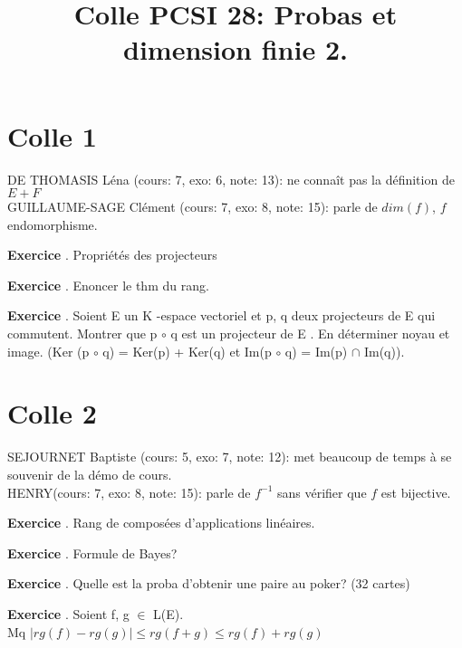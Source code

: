 \documentclass[10pt,a4paper]{article}
\title{Colle PCSI 28: Probas et dimension finie 2.}
\newcounter{question}
\newcounter{exo}
\newenvironment{exo}{\vspace{0.5cm}\setcounter{question}{0}\addtocounter{exo}{1} \noindent \textbf{Exercice \theexo}. \normalsize }{\par}
\begin{document}
	\maketitle
	
	\section*{Colle 1}
	\setcounter{exo}{0}
	DE THOMASIS Léna (cours: 7, exo: 6, note: 13): ne connaît pas la définition de $E + F$\\
	GUILLAUME-SAGE Clément (cours: 7, exo: 8, note: 15): parle de $dim(f)$, $f$ endomorphisme.\\
	
	\begin{exo}
		  Propriétés des projecteurs
	\end{exo}

	\begin{exo}
		Enoncer le thm du rang.
	\end{exo}

	\begin{exo}
		Soient E un K -espace vectoriel et p, q deux projecteurs de E qui commutent.
		Montrer que p $\circ$ q est un projecteur de E . En déterminer noyau et image. (Ker (p $\circ$ q) = Ker(p) + Ker(q) et Im(p $\circ$ q) = Im(p) $\cap$ Im(q)).
	\end{exo}	
	
	\section*{Colle 2}
	\setcounter{exo}{0}
	SEJOURNET Baptiste (cours: 5, exo: 7, note: 12): met beaucoup de temps à se souvenir de la démo de cours.\\
	HENRY(cours: 7, exo: 8, note: 15): parle de $f^{-1}$ sans vérifier que $f$ est bijective.\\
	
	\begin{exo}
		   Rang de composées d'applications linéaires. 
	\end{exo}		

	\begin{exo}
		Formule de Bayes?
	\end{exo}

	\begin{exo}
		Quelle est la proba d'obtenir une paire au poker? (32 cartes)
	\end{exo}
	
	\begin{exo}
		Soient f, g $\in$ L(E).\\
		Mq $\vert rg(f ) - rg(g) \vert \leq rg(f + g) \leq rg(f ) + rg(g)$
	\end{exo}	
\end{document}
